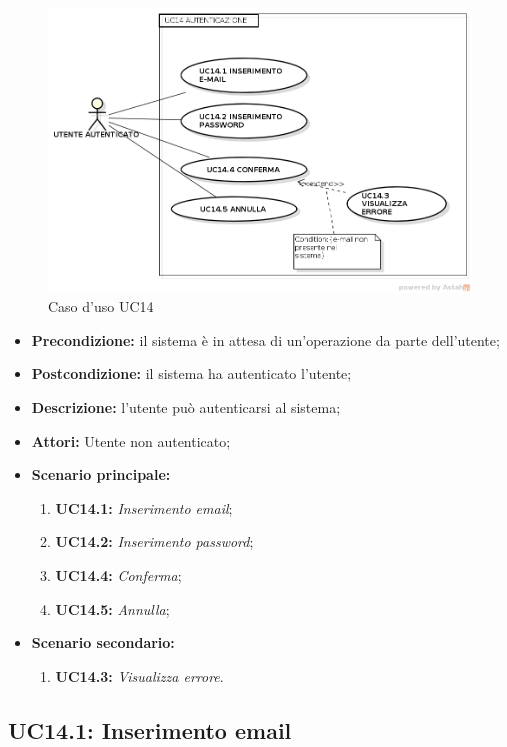 \begin{figure}[H]
	\begin{center}
	\includegraphics[scale=0.4]{diagram/UC14.png}
	\caption{Caso d'uso UC14}
	\end{center}
\end{figure}
\begin{itemize}
	\item \textbf{Precondizione:} il sistema è in attesa di un'operazione da parte dell'utente;
	\item \textbf{Postcondizione:} il sistema ha autenticato l'utente;
	\item \textbf{Descrizione:} l'utente può autenticarsi al sistema;
	\item \textbf{Attori:} Utente non autenticato;
	\item \textbf{Scenario principale:}
	\begin{enumerate}
		\item \textbf{ UC14.1:} \textit{ Inserimento email};
		\item \textbf{ UC14.2:} \textit{ Inserimento password};
		\item \textbf{ UC14.4:} \textit{ Conferma};
		\item \textbf{ UC14.5:} \textit{ Annulla};
	\end{enumerate}
	\item \textbf{Scenario secondario:}
	\begin{enumerate}
		\item \textbf{ UC14.3:} \textit{ Visualizza errore}.
	\end{enumerate}
\end{itemize}
\subsection{ UC14.1: Inserimento email}

